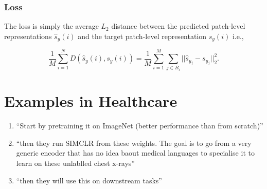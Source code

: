 \documentclass[11pt]{article}
\begin{document}
\subsubsection{Loss}

The loss is simply the average $L_2$ distance between the predicted patch-level representations $\hat s_y(i)$ and the target patch-level representation $s_y(i)$ i.e., 

\begin{equation}
    \frac 1 M \sum^N_{i=1}D(\hat s_y(i), s_y(i))=\frac 1 M \sum^M_{i=1}\sum_{j\in B_i} ||\hat s_{y_j} - s_{y_j} ||^2_2.
\end{equation}

\section{Examples in Healthcare}

\begin{figure}[H]
    \centering
\end{figure}

\begin{enumerate}
    \item ``Start by pretraining it on ImageNet (better performance than from scratch)''
    \item ``then they run SIMCLR from these weights. The goal is to go from a very generic encoder that has no idea baout medical languages to specialise it to learn on these unlablled chest x-rays''
    \item ``then they will use this on downstream tasks''
\end{enumerate}
\end{document}
